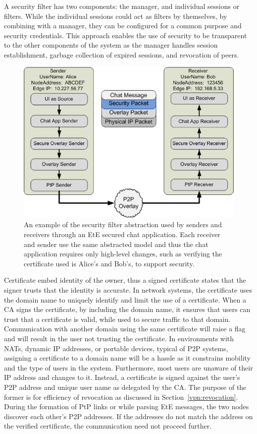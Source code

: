 A security filter has two components: the manager, and individual sessions or
filters.  While the individual sessions could act as filters by themselves, by
combining with a manager, they can be configured for a common purpose and
security credentials.  This approach enables the use of security to be
transparent to the other components of the system as the manager handles
session establishment, garbage collection of expired sessions, and revocation
of peers.

\begin{figure}
\centering
\includegraphics[width=6in]{figs/secure_sender_stack_generic.png.eps}
\caption[Security filter]{An example of the security filter abstraction used by
senders and receivers through an EtE secured chat application.  Each receiver
and sender use the same abstracted model and thus the chat application requires
only high-level changes, such as verifying the certificate used is Alice's and
Bob's, to support security.}
\label{fig:security_filter}
\end{figure}

Certificate embed identity of the owner, thus a signed certificate states that
the signer trusts that the identity is accurate.  In network systems, the
certificate uses the domain name to uniquely identify and limit the use of a
certificate.  When a CA signs the certificate, by including the domain name, it
ensures that users can trust that a certificate is valid, while used to secure
traffic to that domain.  Communication with another domain using the same
certificate will raise a flag and will result in the user not trusting the
certificate.  In environments with NATs, dynamic IP addresses, or portable
devices, typical of P2P systems, assigning a certificate to a domain name will
be a hassle as it constrains mobility and the type of users in the system.
Furthermore, most users are unaware of their IP address and changes to it.
Instead, a certificate is signed against the user's P2P address and unique user
name as delegated by the CA.  The purpose of the former is for efficiency of
revocation as discussed in Section~\ref{vpn:revocation}.  During the formation
of PtP links or while parsing EtE messages, the two nodes discover each other's
P2P addresses.  If the addresses do not match the address on the verified
certificate, the communication need not proceed further.  

